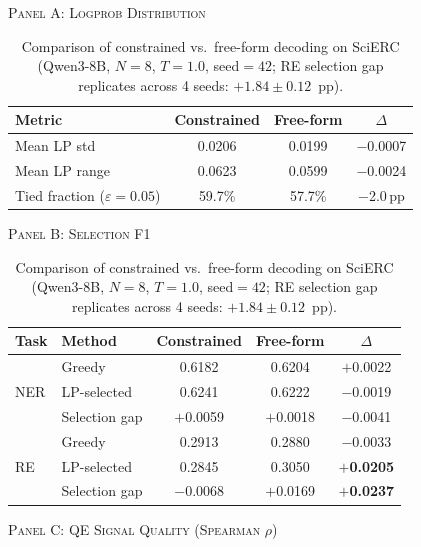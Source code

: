 \begin{table}[t]
\centering
\caption{Comparison of constrained vs.\ free-form decoding on SciERC (Qwen3-8B, $N{=}8$, $T{=}1.0$, seed${=}42$; RE selection gap replicates across 4 seeds: $+1.84{\pm}0.12$~pp).}
\label{tab:freeform_ablation}

\vspace{2pt}
{\small\textsc{Panel A: Logprob Distribution}}
\vspace{2pt}

\begin{tabular}{lccc}
\toprule
Metric & Constrained & Free-form & $\Delta$ \\
\midrule
Mean LP std        & 0.0206 & 0.0199 & $-$0.0007 \\
Mean LP range      & 0.0623 & 0.0599 & $-$0.0024 \\
Tied fraction ($\varepsilon{=}0.05$) & 59.7\% & 57.7\% & $-$2.0\,pp \\
\bottomrule
\end{tabular}

\vspace{8pt}

{\small\textsc{Panel B: Selection F1}}
\vspace{2pt}

\begin{tabular}{llccc}
\toprule
Task & Method & Constrained & Free-form & $\Delta$ \\
\midrule
\multirow{3}{*}{NER}
  & Greedy        & 0.6182 & 0.6204 & $+$0.0022 \\
  & LP-selected   & 0.6241 & 0.6222 & $-$0.0019 \\
  & Selection gap & $+$0.0059 & $+$0.0018 & $-$0.0041 \\
\midrule
\multirow{3}{*}{RE}
  & Greedy        & 0.2913 & 0.2880 & $-$0.0033 \\
  & LP-selected   & 0.2845 & 0.3050 & \textbf{$+$0.0205} \\
  & Selection gap & $-$0.0068 & $+$0.0169 & \textbf{$+$0.0237} \\
\bottomrule
\end{tabular}

\vspace{8pt}

{\small\textsc{Panel C: QE Signal Quality (Spearman $\rho$)}}
\vspace{2pt}


\end{table}
